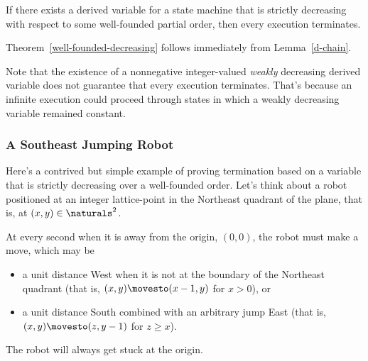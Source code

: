 \begin{theorem}\label{well-founded-decreasing}
  If there exists a derived variable for a state machine that is strictly
  decreasing with respect to some well-founded partial order, then every
  execution terminates.
\end{theorem}

Theorem~\ref{well-founded-decreasing} follows immediately from
Lemma~\ref{d-chain}.

Note that the existence of a nonnegative integer-valued \emph{weakly}
decreasing derived variable does not guarantee that every execution
terminates.  That's because an infinite execution could proceed through
states in which a weakly decreasing variable remained constant.

\subsubsection{A Southeast Jumping Robot}

\iffalse Begin by defining the trivial ``pick how long'' game: P1 picks $n
\in \naturals$, the P2 and P1 alternate making forced moves.  The game
ends after $n$ forced moves; the last person to move wins.  So P1 strategy
is ``pick and even number.''  Insert here the discussion of ``terminates,
but no bound on number of steps...'' used below.

May also tell the ``guess a bigger number game''joke.
\fi

Here's a contrived but simple example of proving termination based on a
variable that is strictly decreasing over a well-founded order.  Let's
think about a robot positioned at an integer lattice-point in the
Northeast quadrant of the plane, that is, at $(x,y) \in \naturals^2$.

At every second when it is away from the origin, $(0,0)$, the robot must
make a move, which may be
\begin{itemize}

\item a unit distance West when it is not at the boundary of the Northeast
  quadrant (that is, $(x,y) \movesto (x-1,y)$ for $x>0$), or

\item a unit distance South combined with an arbitrary jump East (that is,
     $(x,y) \movesto (z,y-1)$ for $z\geq x$).

\end{itemize}
\begin{claim}\label{robotcl}
The robot will always get stuck at the origin.
\end{claim}

